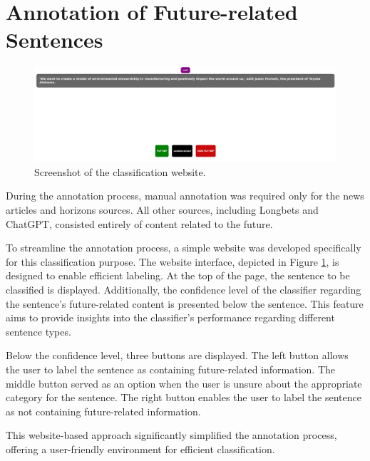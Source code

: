 \documentclass[a4paper,10pt]{report}
\begin{document}
\section{Annotation of Future-related Sentences}
\begin{figure}
  \centering
  \includegraphics[width=16cm]{img/classification_website.png}
  \caption{Screenshot of the classification website.}
  \label{fig:classification_website}
\end{figure}
During the annotation process, manual annotation was required only for the news articles and horizons sources. All other sources, including Longbets and ChatGPT, consisted entirely of content related to the future.

To streamline the annotation process, a simple website was developed specifically for this classification purpose. The website interface, depicted in Figure \ref{fig:classification_website}, is designed to enable efficient labeling. At the top of the page, the sentence to be classified is displayed. Additionally, the confidence level of the classifier regarding the sentence's future-related content is presented below the sentence. This feature aims to provide insights into the classifier's performance regarding different sentence types.

Below the confidence level, three buttons are displayed. The left button allows the user to label the sentence as containing future-related information. The middle button served as an option when the user is unsure about the appropriate category for the sentence. The right button enables the user to label the sentence as not containing future-related information.

This website-based approach significantly simplified the annotation process, offering a user-friendly environment for efficient classification.
\end{document}
